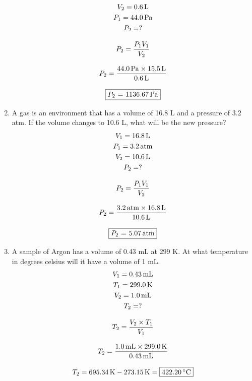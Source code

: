 \documentclass[12pt, a4paper]{article}
\begin{document}
\begin{enumerate}
\begin{gather*}
		V_2 = \SI{0.6}{\l}\\
		P_1 = \SI{44.0}{\pascal}\\
		P_2 = ?\\[3mm]
		P_2 = \dfrac{P_1 V_1}{V_2}\\[3mm]
		P_2 = \dfrac{\SI{44.0}{\pascal} \times \SI{15.5}{\l}}{\SI{0.6}{\l}}\\[3mm]
		\fbox{$P_2$ = \SI{1136.67}{Pa}}
		\end{gather*}
	\item  A gas is an environment that has a volume of 16.8 L and a pressure of 3.2 atm. If the volume changes to 10.6 L, what will be the new pressure?
		\begin{gather*}
		V_1 = \SI{16.8}{\l}\\
		P_1 = \SI{3.2}{atm}\\
		V_2 = \SI{10.6}{\l}\\
		P_2 = ?\\[3mm]
		P_2 = \dfrac{P_1 V_1}{V_2}\\[3mm]
		P_2 = \dfrac{\SI{3.2}{atm} \times \SI{16.8}{\l}}{\SI{10.6}{\l}}\\[3mm]
		\fbox{$P_2$ = \SI{5.07}{atm}}
		\end{gather*}
	\item A sample of Argon has a volume of 0.43 mL at 299 K. At what temperature in degrees celsius will it have a volume of 1 mL. 
		\begin{gather*}
		V_1 = \SI{0.43}{\ml}\\
		T_1 = \SI{299.0}{\kelvin}\\
		V_2 = \SI{1.0}{\ml}\\
		T_2 = ?\\[3mm]
		T_2 = \dfrac{V_2 \times T_1}{V_1}\\[3mm]
		T_2 = \dfrac{\SI{1.0}{\ml} \times \SI{299.0}{\kelvin}}{\SI{0.43}{\ml}}\\[3mm]
		T_2 = \SI{695.34}{\kelvin} - \SI{273.15}{\kelvin} = \fbox{\SI{422.20}{\celsius}}
		\end{gather*}

		\newpage


\end{enumerate}
\end{document}
